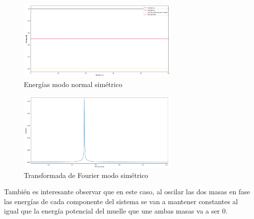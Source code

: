 \documentclass{article}
\begin{document}
\begin{figure}[H]
\centering
\includegraphics[width=0.7\textwidth]{simetrico_energias_debil}
\caption{Energías modo normal simétrico}
\label{fig:3}
\end{figure}

\begin{figure}[H]
\centering
\includegraphics[width=0.7\textwidth]{simetrico_fourier_debil}
\caption{Transformada de Fourier modo simétrico}
\label{fig:17}
\end{figure}
También es interesante observar que en este caso, al oscilar las dos masas en fase las energías de cada componente del sistema se van a mantener constantes al igual que la energía potencial del muelle que une ambas masas va a ser 0.
\end{document}
